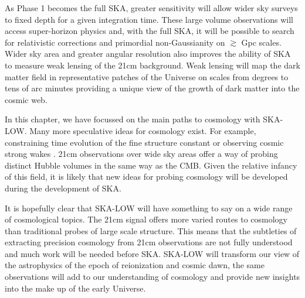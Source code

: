 \documentclass{PoS}
\begin{document}
As Phase 1 becomes the full SKA, greater sensitivity will allow wider sky surveys to fixed depth for a given integration time. These large volume observations will access super-horizon physics and, with the full SKA, it will be possible to search for relativistic corrections and primordial non-Gaussianity on $\gtrsim$ Gpc scales. Wider sky area and greater angular resolution also improves the ability of SKA to measure weak lensing of the 21cm background. Weak lensing will map the dark matter field in representative patches of the Universe on scales from degrees to tens of arc minutes providing a unique view of the growth of dark matter into the cosmic web.

In this chapter, we have focussed on the main paths to cosmology with SKA-LOW. Many more speculative ideas for cosmology exist. For example, constraining time evolution of the fine structure constant \citep{2007PhRvL..98k1301K} or observing cosmic strong wakes \citep{2010JCAP...12..028B}. 21cm observations over wide sky areas offer a way of probing distinct Hubble volumes in the same way as the CMB. Given the relative infancy of this field, it is likely that new ideas for probing cosmology will be developed during the development of SKA.

It is hopefully clear that SKA-LOW will have something to say on a wide range of cosmological topics. The 21cm signal offers more varied routes to cosmology than traditional probes of large scale structure. This means that the subtleties of extracting precision cosmology from 21cm observations are not fully understood and much work will be needed before SKA. SKA-LOW will transform our view of the astrophysics of the epoch of reionization and cosmic dawn, the same observations will add to our understanding of cosmology and provide new insights into the make up of the early Universe.





\end{document}
